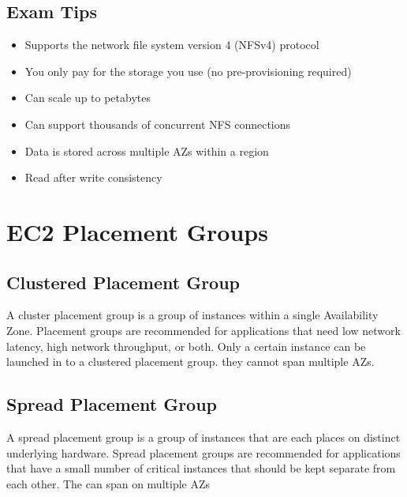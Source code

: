 \documentclass{article}
\begin{document}
\subsection{Exam Tips}
\begin{itemize}
\item
Supports the network file system version 4 (NFSv4) protocol

\item
You only pay for the storage you use (no pre-provisioning required)

\item
Can scale up to petabytes

\item
Can support thousands of concurrent NFS connections

\item
Data is stored across multiple AZs within a region

\item
Read after write consistency
\end{itemize}

\section{EC2 Placement Groups}
\subsection{Clustered Placement Group}
A cluster placement group is a group of instances within a single Availability Zone. Placement groups are recommended for applications that need low network latency, high network throughput, or both. Only a certain instance can be launched in to a clustered placement group. they cannot span multiple AZs.

\subsection{Spread Placement Group}
A spread placement group is a group of instances that are each places on distinct underlying hardware. Spread placement groups are recommended for applications that have a small number of critical instances that should be kept separate from each other. The can span on multiple AZs
\end{document}
